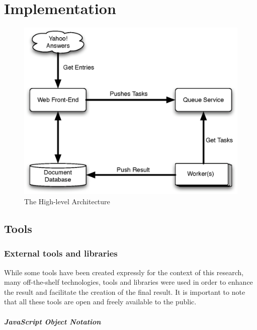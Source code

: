 \chapter{Implementation} %
\label{cha:implementation}

\begin{figure}[ht!]
  \begin{center}
    \includegraphics[width=\linewidth]{images/architecture}
  \end{center}
  \caption{The High-level Architecture}\label{fig:architecture}
\end{figure}



\section{Tools} %
\label{sec:tools}

\subsection{External tools and libraries} %
\label{sub:external_tools_and_libraries}

While some tools have been created expressly for the context of this research, many off-the-shelf technologies, tools and libraries were used in order to enhance the result and facilitate the creation of the final result. It is important to note that all these tools are open and freely available to the public.

\paragraph{JavaScript Object Notation} %
\label{par:javascript_object_notation}

